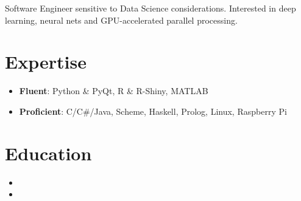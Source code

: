 \documentclass[11pt,a4paper,sans]{moderncv}        %
\begin{document}
\makecvtitle

\small{Software Engineer sensitive to Data Science considerations. Interested in deep learning, neural nets and GPU-accelerated parallel processing.}

\section{Expertise}
  \begin{itemize}
   \item{
     \textbf{Fluent}{: Python \& PyQt, R \& R-Shiny, MATLAB}
      }
   \item{
     \textbf{Proficient}{: C/C\#/Java, Scheme, Haskell, Prolog, Linux, Raspberry Pi}
   }
 \end{itemize}

\section{Education}
  \begin{itemize}
      \item{}
    \item{}
    \end{itemize}

  
\end{document}
